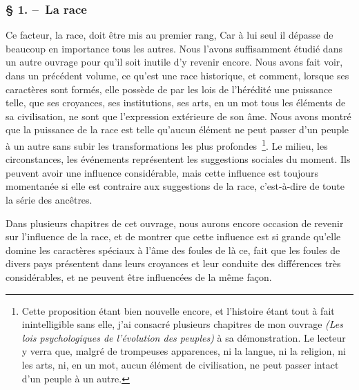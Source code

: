 \documentclass[french,twoside]{book} %
\begin{document}
\subsubsection[{§ 1. – La race}]{§ 1. – La race}
\noindent Ce facteur, la race, doit être mis au premier rang, Car à lui seul il dépasse de beaucoup en importance tous les autres. Nous l’avons suffisamment étudié dans un autre ouvrage pour qu’il soit inutile d’y revenir encore. Nous avons fait voir, dans un précédent volume, ce qu’est une race historique, et comment, lorsque ses caractères sont formés, elle possède de par les lois de l’hérédité une puissance telle, que ses croyances, ses institutions, ses arts, en un mot tous les éléments de sa civilisation, ne sont que l’expression extérieure de son âme. Nous avons montré que la puissance de la race est telle qu’aucun élément ne peut passer d’un peuple à un autre sans subir les transformations les plus profondes \footnote{Cette proposition étant bien nouvelle encore, et l’histoire étant tout à fait inintelligible sans elle, j’ai consacré plusieurs chapitres de mon ouvrage \emph{(Les lois psychologiques de l’évolution des peuples)} à sa démonstration. Le lecteur y verra que, malgré de trompeuses apparences, ni la langue, ni la religion, ni les arts, ni, en un mot, aucun élément de civilisation, ne peut passer intact d’un peuple à un autre.}. Le milieu, les circonstances, les événements représentent les suggestions sociales du moment. Ils peuvent avoir une influence considérable, mais cette influence est toujours momentanée si elle est contraire aux suggestions de la race, c’est-à-dire de toute la série des ancêtres.\par
Dans plusieurs chapitres de cet ouvrage, nous aurons encore occasion de revenir sur l’influence de la race, et de montrer que cette influence est si grande qu’elle domine les caractères spéciaux à l’âme des foules de là ce, fait que les foules de divers pays présentent dans leurs croyances et leur conduite des différences très considé­rables, et ne peuvent être influencées de la même façon.
\end{document}
